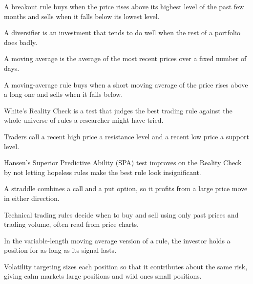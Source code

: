 \begin{keyterms}
\footnotesize
\begin{description}[leftmargin=0pt, itemsep=0pt, parsep=0pt, topsep=0pt, font=\normalfont\bfseries\color{FEMaroon}]
  \item[Breakout rule.] A breakout rule buys when the price rises above its highest level of the past few months and sells when it falls below its lowest level.
  \item[Diversifier.] A diversifier is an investment that tends to do well when the rest of a portfolio does badly.
  \item[Moving average.] A moving average is the average of the most recent prices over a fixed number of days.
  \item[Moving-average rule.] A moving-average rule buys when a short moving average of the price rises above a long one and sells when it falls below.
  \item[Reality Check.] White's Reality Check is a test that judges the best trading rule against the whole universe of rules a researcher might have tried.
  \item[Resistance and support levels.] Traders call a recent high price a resistance level and a recent low price a support level.
  \item[SPA test.] Hansen's Superior Predictive Ability (SPA) test improves on the Reality Check by not letting hopeless rules make the best rule look insignificant.
  \item[Straddle.] A straddle combines a call and a put option, so it profits from a large price move in either direction.
  \item[Technical trading rules.] Technical trading rules decide when to buy and sell using only past prices and trading volume, often read from price charts.
  \item[Variable-length moving average.] In the variable-length moving average version of a rule, the investor holds a position for as long as its signal lasts.
  \item[Volatility targeting.] Volatility targeting sizes each position so that it contributes about the same risk, giving calm markets large positions and wild ones small positions.
\end{description}
\end{keyterms}

